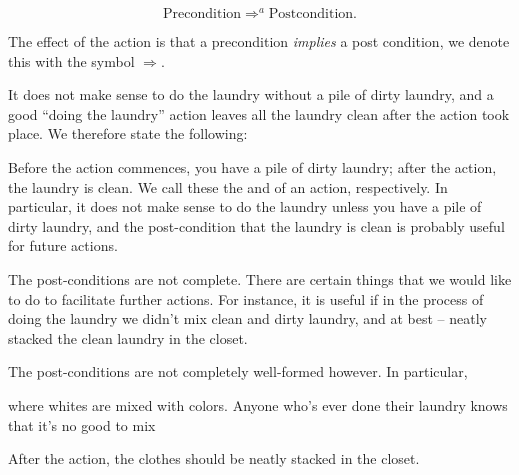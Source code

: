 \begin{equation}
\text{Precondition} \Rightarrow^a \text{Postcondition}.
\end{equation}


The effect
of the action is that a precondition \emph{implies} a post condition, we denote
this with the symbol $\Rightarrow$.

It does not make sense to do the laundry without a pile of dirty laundry, and a
good ``doing the laundry'' action leaves all the laundry clean after the action
took place. We therefore state the following:

 Before the action
commences, you have a pile of dirty laundry; after the action, the laundry is
clean. We call these the  and  of an action,
respectively. In particular, it does not make sense to do the laundry unless
you have a pile of dirty laundry, and the post-condition that the laundry is
clean is probably useful for future actions.

The post-conditions are not complete. There are certain things that we would
like to do to facilitate further actions. For instance, it is useful if in the
process of doing the laundry we didn't mix clean and dirty laundry, and at best
-- neatly stacked the clean laundry in the closet.


The post-conditions are not
completely well-formed however. In particular, 

where whites are mixed with
colors. Anyone who's ever done their laundry knows that it's no good to mix 

After the action, the clothes should be neatly stacked in the closet. 

